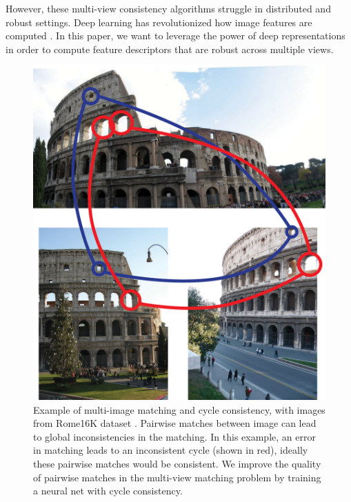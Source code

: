 \documentclass[10pt,twocolumn,letterpaper]{article}
\begin{document}
However, these multi-view consistency algorithms struggle in distributed and robust settings.
Deep learning has revolutionized how image features are computed \cite{yi2016lift}.
In this paper, we want to leverage the power of deep representations in order to compute feature descriptors that are robust across multiple views.

\begin{figure}[t]
\begin{center}
  \includegraphics[width=0.8\linewidth]{figures-CycleConsistencyBasic-v2.pdf}
\end{center}
  \caption{
    Example of multi-image matching and cycle consistency, with images from Rome16K dataset \cite{li2010location}.
    Pairwise matches between image can lead to global inconsistencies in the matching.
    In this example, an error in matching leads to an inconsistent cycle (shown in red), ideally these pairwise matches would be consistent.
    We improve the quality of pairwise matches in the multi-view matching problem by training a neural net with cycle consistency.
  }
\label{fig:cycconsistex}
\label{fig:onecol}
\end{figure}
\end{document}
